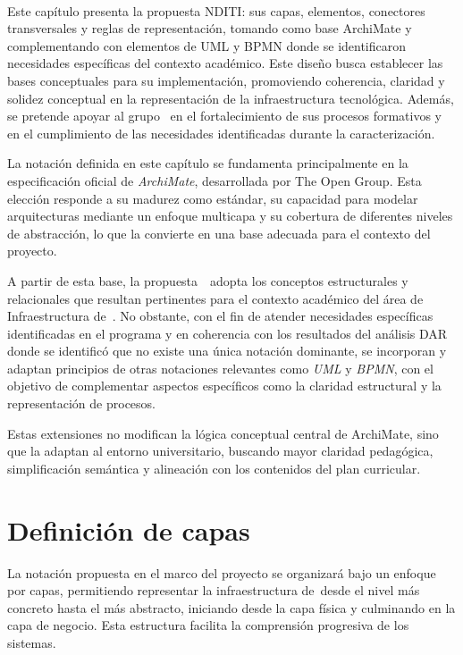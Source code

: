 \label{cap:disenio}
\mbox{}\\

Este capítulo presenta la propuesta NDITI: sus capas, elementos, conectores transversales y reglas de representación, tomando como base ArchiMate y complementando con elementos de UML y BPMN donde se identificaron necesidades específicas del contexto académico. Este diseño busca establecer las bases conceptuales para su implementación, promoviendo coherencia, claridad y solidez conceptual en la representación de la infraestructura tecnológica. Además, se pretende apoyar al grupo \GRID~en el fortalecimiento de sus procesos formativos y en el cumplimiento de las necesidades identificadas durante la caracterización.

La notación definida en este capítulo se fundamenta principalmente en la especificación oficial de \textit{ArchiMate}, desarrollada por The Open Group. Esta elección responde a su madurez como estándar, su capacidad para modelar arquitecturas mediante un enfoque multicapa y su cobertura de diferentes niveles de abstracción, lo que la convierte en una base adecuada para el contexto del proyecto.

A partir de esta base, la propuesta~\NDITI~adopta los conceptos estructurales y relacionales que resultan pertinentes para el contexto académico del área de Infraestructura de~\TI. No obstante, con el fin de atender necesidades específicas identificadas en el programa y en coherencia con los resultados del análisis DAR donde se identificó que no existe una única notación dominante, se incorporan y adaptan principios de otras notaciones relevantes como \textit{UML} y \textit{BPMN}, con el objetivo de complementar aspectos específicos como la claridad estructural y la representación de procesos.

Estas extensiones no modifican la lógica conceptual central de ArchiMate, sino que la adaptan al entorno universitario, buscando mayor claridad pedagógica, simplificación semántica y alineación con los contenidos del plan curricular.

\section{Definición de capas}
\noindent
La notación propuesta en el marco del proyecto se organizará bajo un enfoque por capas, permitiendo representar la infraestructura de~\TI desde el nivel más concreto hasta el más abstracto, iniciando desde la capa física y culminando en la capa de negocio. Esta estructura facilita la comprensión progresiva de los sistemas.

